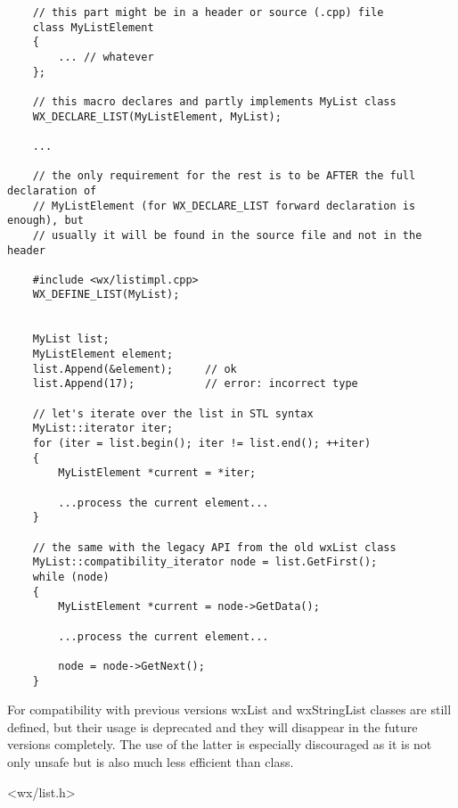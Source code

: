 \begin{verbatim}
    // this part might be in a header or source (.cpp) file
    class MyListElement
    {
        ... // whatever
    };

    // this macro declares and partly implements MyList class
    WX_DECLARE_LIST(MyListElement, MyList);

    ...

    // the only requirement for the rest is to be AFTER the full declaration of
    // MyListElement (for WX_DECLARE_LIST forward declaration is enough), but
    // usually it will be found in the source file and not in the header

    #include <wx/listimpl.cpp>
    WX_DEFINE_LIST(MyList);


    MyList list;
    MyListElement element;
    list.Append(&element);     // ok
    list.Append(17);           // error: incorrect type

    // let's iterate over the list in STL syntax
    MyList::iterator iter;
    for (iter = list.begin(); iter != list.end(); ++iter)
    {
        MyListElement *current = *iter;

        ...process the current element...
    }

    // the same with the legacy API from the old wxList class
    MyList::compatibility_iterator node = list.GetFirst();
    while (node)
    {
        MyListElement *current = node->GetData();

        ...process the current element...
        
        node = node->GetNext();
    }

\end{verbatim}

For compatibility with previous versions wxList and wxStringList classes are
still defined, but their usage is deprecated and they will disappear in the
future versions completely. The use of the latter is especially discouraged as
it is not only unsafe but is also much less efficient than
 class.


<wx/list.h>






